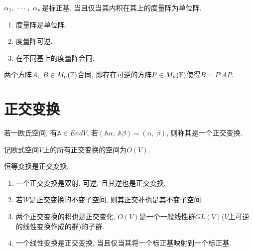 \begin{example}
    ${\alpha}{_1},\ \cdots,\ {\alpha}{_{n}}$是标正基, 当且仅当其内积在其上的度量阵为单位阵.
\end{example}

\begin{property}
    \par
    \begin{enumerate}[itemindent=1em]
        \item 度量阵是单位阵.
        \item 度量阵可逆.
        \item 在不同基上的度量阵合同.
    \end{enumerate}
\end{property}

\begin{definition}[合同]
    两个方阵$A,\ B\in M_{n}(\mathbb{F})$合同, 即存在可逆的方阵$P\in M_{n}(\mathbb{F})$使得$B=P'AP$.
\end{definition}


\section{ 正交变换 }

\begin{definition}[正交变换]
    若一欧氏空间, 有$\mathbb{A}\in EndV$, 若$(\mathbb{A}\alpha,\ \mathbb{A}\beta)=(\alpha,\ \beta)$, 则称其是一个正交变换.\par
    记欧式空间$V$上的所有正交变换的空间为$O(V)$.
\end{definition}

\begin{example}
    恒等变换是正交变换.
\end{example}

\begin{property}
    \par
    \begin{enumerate}[itemindent=1em]
        \item 一个正交变换是双射, 可逆, 且其逆也是正交变换.
        \item 若$W$是正交变换的不变子空间, 则其正交补也是其不变子空间.
        \item 两个正交变换的积也是正交变化, $O(V)$是一个一般线性群$GL(V)$($V$上可逆的线性变换作成的群)的子群.
        \item 一个线性变换是正交变换, 当且仅当其将一个标正基映射到一个标正基.
    \end{enumerate}
\end{property}

